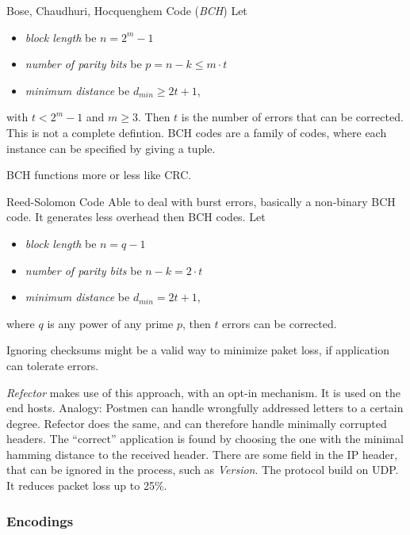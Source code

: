 \documentclass[english]{panikzettel}
\begin{document}
	\begin{defi}{Bose, Chaudhuri, Hocquenghem Code (\textit{BCH})}
		Let 
		\begin{itemize}
			\item \textit{block length} be \( n = 2^m -1 \)
			\item \textit{number of parity bits } be \( p = n - k \leq m \cdot t \)
			\item \textit{minimum distance} be \( d_{min} \geq 2t + 1 \),
		\end{itemize}
		with \( t < 2^{m} - 1 \) and \( m \geq 3 \). 
		Then \( t \) is the number of errors that can be corrected. 
		\tcblower
		This is not a complete defintion. 
		BCH codes are a family of codes, where each instance can be specified by giving a tuple.
	\end{defi}
	BCH functions more or less like CRC.
	
	\begin{defi}{Reed-Solomon Code}
		Able to deal with burst errors, basically a non-binary BCH code. It generates less overhead then BCH codes. Let
		\begin{itemize}
			\item \textit{block length} be \( n = q-1 \)
			\item \textit{number of parity bits} be \( n - k= 2 \cdot t \)
			\item \textit{minimum distance} be \( d_{min} = 2t + 1 \),
		\end{itemize}
		where \( q \) is any power of any prime \( p \), then \( t \) errors can be corrected.
	\end{defi}

	Ignoring checksums might be a valid way to minimize paket loss, if application can tolerate errors.

	\textit{Refector} makes use of this approach, with an opt-in mechanism.
	It is used on the end hosts.
	Analogy: Postmen can handle wrongfully addressed letters to a certain degree.
	Refector does the same, and can therefore handle minimally corrupted headers.
	The \enquote{correct} application is found by choosing the one with the minimal hamming distance to the received header. 
	There are some field in the IP header, that can be ignored in the process, such as \textit{Version}.
	The protocol build on UDP.
	It reduces packet loss up to 25\%.

	\subsubsection{Encodings}
	\label{sss-encodings}
	
\end{document}
